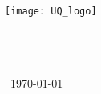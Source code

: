 \begin{titlepage} 
	
	\center %
	
	\texttt{[image: UQ\_logo]}\\[1.7cm]
	
	\HRule\\[0.65cm]
	
	{\huge\bfseries \documentTitle}\\[0.3cm]
	
	\HRule\\[1.7cm]
	
	\department \departShortT
	
	\vfill
	
	\titlepageAuthors
	
	\vfill %
	\
	{\large\today} 
	
	
	\vfill %
	
\end{titlepage}